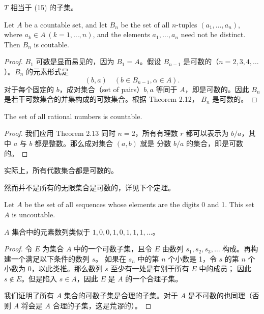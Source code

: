 \documentclass[../poma-notes.tex]{subfiles}
\begin{document}
$T$ 相当于 (15) 的子集。

\begin{theorem}
  Let $A$ be a countable set, and let $B_n$ be the set of all $n$-tuples $(a_1,\dots,a_n)$, where
  $a_k \in A \ (k=1,\dots,n)$, and the elements $a_1,\dots,a_n$ need not be distinct. Then $B_n$ is coutable.
\end{theorem}

\begin{proof}
  $B_1$ 可数是显而易见的，因为 $B_1=A$。假设 $B_{n-1}$ 是可数的（$n=2,3,4,\dots$）。$B_n$ 的元素形式是
  \begin{equation}
    (b,a) \quad (b \in B_{n-1}, \alpha \in A).
  \end{equation}
  对于每个固定的 $b$，成对集合（set of pairs）$b, a$ 等同于 $A$，即是可数的。因此 $B_n$ 是若干可数集合的并集构成的可数集合。根据 Theorem 2.12，
  $B_n$ 是可数的。
\end{proof}

\begin{corollary}
  The set of all rational numbers is countable.
\end{corollary}

\begin{proof}
  我们应用 Theorem 2.13 同时 $n=2$，所有有理数 $r$ 都可以表示为 $b/a$，其中 $a$ 与 $b$ 都是整数。那么成对集合 $(a, b)$ 就是
  分数 $b/a$ 的集合，即是可数的。
\end{proof}

实际上，所有代数集合都是可数的。

然而并不是所有的无限集合是可数的，详见下个定理。

\begin{theorem}
  Let $A$ be the set of all sequences whose elements are the digits 0 and 1. This set $A$ is uncoutable.
\end{theorem}

$A$ 集合中的元素数列类似于 $1, 0, 0, 1, 0, 1, 1, 1, \dots$。

\begin{proof}
  令 $E$ 为集合 $A$ 中的一个可数子集，且令 $E$ 由数列 $s_1, s_2, s_3, \dots$ 构成。再构建一个满足以下条件的数列 $s$。
  如果在 $s_n$ 中的第 $n$ 个小数是 1，令 $s$ 的第 $n$ 个小数为 0，以此类推。那么数列 $s$ 至少有一处是有别于所有 $E$ 中的成员；
  因此 $s \notin E$。但是陷入 $s \in A$，因此 $E$ 是 $A$ 的一个合理子集。

  我们证明了所有 $A$ 集合的可数子集是合理的子集。对于 $A$ 是不可数的也同理（否则 $A$ 将会是 $A$ 合理的子集，这是荒谬的）。
\end{proof}
\end{document}

